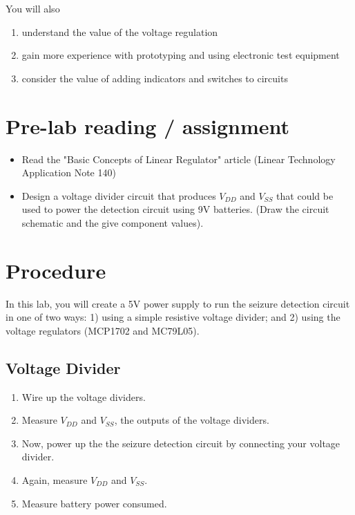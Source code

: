 \documentclass[12pt,oneside]{article}
\begin{document}
You will also
\begin{enumerate}%
\item understand the value of the voltage regulation
\item gain more experience with prototyping and using electronic test equipment
\item consider the value of adding indicators and switches to circuits
\end{enumerate}

\section{Pre-lab reading / assignment}
\begin{itemize}
\item Read the "Basic Concepts of Linear Regulator" article (Linear Technology Application Note 140) %
\item Design a voltage divider circuit that produces $V_{DD}$ and $V_{SS}$ that could be used to power the detection circuit using 9V batteries.  (Draw the circuit schematic and the give component values). 
\end{itemize}


\section{Procedure}
In this lab, you will create a 5V power supply to run the seizure detection circuit in one of two ways: 1) using a simple resistive voltage divider; and 2) using the voltage regulators (MCP1702 and MC79L05).

\subsection{Voltage Divider}
\begin{enumerate}
\item Wire up the voltage dividers.
\item Measure $V_{DD}$ and $V_{SS}$, the outputs of the voltage dividers.
\item Now, power up the the seizure detection circuit by connecting your voltage divider.
\item Again, measure $V_{DD}$ and $V_{SS}$.
\item Measure battery power consumed.
\end{enumerate}
\end{document}
